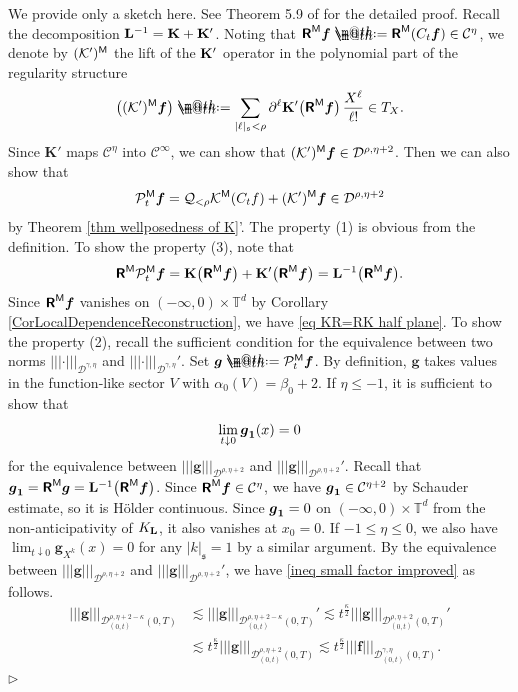 \documentclass[10pt, reqno]{amsart}
\makeatletter
\numberwithin{subsection}{section}
\numberwithin{subsubsection}{subsection}
\numberwithin{equation}{section} %
\newenvironment{Dem}[1][\unskip]{%
    \begin{list}{\hspace{1.15cm}{\sf \textbf{{\small Proof #1 --}}}}{%
        \setlength{\topsep}{0pt}%
        \setlength{\leftmargin}{0pt}%
        \setlength{\rightmargin}{0pt}%
        \setlength{\listparindent}{0pt}%
        \setlength{\itemindent}{0pt}%
        \setlength{\parsep}{0pt}%
        \addtolength{\leftmargin}{0pt}%
        \addtolength{\rightmargin}{0pt}%
    } \item }{\hfill $\rhd$\end{list}\smallskip}
\theoremstyle{mystyle}
\theoremstyle{mystyle2}
\theoremstyle{mystyle3}
\newcommand{\trino}[1]{|\!|\!|#1|\!|\!|}
\newcommand{\bsf}{\boldsymbol{f}}
\newcommand{\bsg}{\boldsymbol{g}}
\newcommand{\mfs}{\mathfrak{s}}
\newcommand{\bbT}{\mathbb{T}}
\newcommand{\mcC}{\mathcal{C}}
\newcommand{\mcD}{\mathcal{D}}
\newcommand{\mcK}{\mathcal{K}}
\newcommand{\mcP}{\mathcal{P}}
\newcommand{\mcQ}{\mathcal{Q}}
\newcommand{\bfK}{\mathbf{K}}
\newcommand*{\defeq}{\mathrel{\rlap{%
                     \raisebox{0.3ex}{$\m@th\cdot$}}%
                     \raisebox{-0.3ex}{$\m@th\cdot$}}%
                     =}
\makeatother
\begin{document}
\begin{Dem}
We provide only a sketch here. See Theorem 5.9 of \cite{HT24} for the detailed proof.
Recall the decomposition ${\bf L}^{-1}={\bf K}+{\bf K}'$.
Noting that $\textbf{\textsf{R}}^{\sf M}\bsf\defeq\textbf{\textsf{R}}^{\sf M}(C_t\bsf)\in\mcC^\eta$, we denote by $(\mcK')^{\sf M}$ the lift of the ${\bf K}'$ operator in the polynomial part of the regularity structure
$$
\big((\mcK')^{\sf M}\bsf\big) \defeq  \sum_{\vert\ell\vert_{\frak{s}} 
< \rho} \partial^\ell{\bf K}'\big(\textbf{\textsf{R}}^{\sf M}\bsf\big)\,
\frac{X^\ell}{\ell!} \in T_X.
$$
Since $\bfK'$ maps $\mcC^\eta$ into $\mcC^\infty$, we can show that $(\mcK')^{\sf M}\bsf\in\mcD^{\rho,\eta+2}$.
Then we can also show that
$$
\mcP_t^{\sf M}\bsf=\mcQ_{<\rho}\mcK^{\sf M}(C_tf)+(\mcK')^{\sf M}\bsf\in\mcD^{\rho,\eta+2}
$$
by Theorem \ref{thm wellposedness of K}'.
The property (1) is obvious from the definition. To show the property (3), note that
\begin{align*}
\textbf{\textsf{R}}^{\sf M}\mcP_t^{\sf M}\bsf
={\bf K}\big(\textbf{\textsf{R}}^{\sf M}\bsf\big)+{\bf K}'\big(\textbf{\textsf{R}}^{\sf M}\bsf\big)
={\bf L}^{-1}\big(\textbf{\textsf{R}}^{\sf M}\bsf\big).
\end{align*}
Since $\textbf{\textsf{R}}^{\sf M}\bsf$ vanishes on $(-\infty,0)\times\bbT^d$ by Corollary \ref{CorLocalDependenceReconstruction}, we have \eqref{eq KR=RK half plane}.
To show the property (2), recall the sufficient condition for the equivalence between two norms $\trino{\cdot}_{\mcD^{\gamma,\eta}}$ and $\trino{\cdot}_{\mcD^{\gamma,\eta}}'$.
Set $\bsg\defeq\mcP_t^{\sf M}\bsf$.
By definition, $\bsg$ takes values in the function-like sector $V$ with $\alpha_0(V)=\beta_0+2$. 
If $\eta\le-1$, it is sufficient to show that
$$
\lim_{t\downarrow0}\bsg_{\bf1}(x)=0
$$
for the equivalence between $\trino{\bsg}_{\mcD^{\rho,\eta+2}}$ and $\trino{\bsg}_{\mcD^{\rho,\eta+2}}'$.
Recall that $\bsg_{\bf1}=\textbf{\textsf{R}}^{\sf M}\bsg={\bf L}^{-1}\big(\textbf{\textsf{R}}^{\sf M}\bsf\big)$.
Since $\textbf{\textsf{R}}^{\sf M}\bsf\in\mcC^\eta$, we have $\bsg_{\bf1}\in\mcC^{\eta+2}$ by Schauder estimate, so it is H\"older continuous. Since $\bsg_{\bf1}=0$ on $(-\infty,0)\times\bbT^d$ from the non-anticipativity of $K_{\bf L}$, it also vanishes at $x_0=0$.
If $-1\le\eta\le0$, we also have $\lim_{t\downarrow0}\bsg_{X^k}(x)=0$ for any $|k|_\mfs=1$ by a similar argument. By the equivalence between $\trino{\bsg}_{\mcD^{\rho,\eta+2}}$ and $\trino{\bsg}_{\mcD^{\rho,\eta+2}}'$, we have \eqref{ineq small factor improved} as follows.
\begin{align*}
|\!|\!|\bsg |\!|\!|_{\mcD_{(0,t)}^{\rho,\eta+2-\kappa}(0,T)}
&\lesssim
|\!|\!|\bsg |\!|\!|_{\mcD_{(0,t)}^{\rho,\eta+2-\kappa}(0,T)}'
\lesssim
t^{\frac\kappa2}|\!|\!|\bsg |\!|\!|_{\mcD_{(0,t)}^{\rho,\eta+2}(0,T)}'\\
&\lesssim
t^{\frac\kappa2}|\!|\!|\bsg |\!|\!|_{\mcD_{(0,t)}^{\rho,\eta+2}(0,T)}
\lesssim
t^{\frac\kappa2}|\!|\!|\bsf |\!|\!|_{\mcD_{(0,t)}^{\gamma,\eta}(0,T)}.
\end{align*}
\end{Dem}
\end{document}
